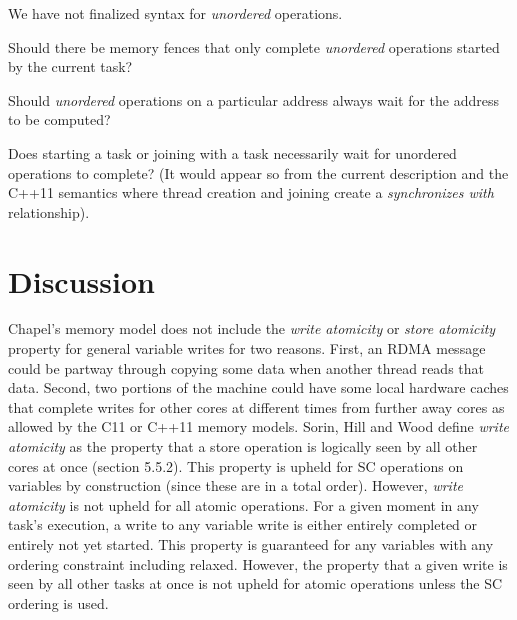 \begin{openissue}
  We have not finalized syntax for \textit{unordered} operations.
\end{openissue}
\begin{openissue}
  Should there be memory fences that only complete \textit{unordered} operations started by the current task?
\end{openissue}
\begin{openissue}
  Should \textit{unordered} operations on a particular address always wait for the address to be computed?
\end{openissue}
\begin{openissue}
  Does starting a task or joining with a task necessarily wait for unordered
  operations to complete? (It would appear so from the current description
  and the C++11 semantics where thread creation and joining create a
  \textit{synchronizes with} relationship).
\end{openissue}

\section{Discussion}

Chapel's memory model does not include the \textit{write atomicity} or
\textit{store atomicity} property for general variable writes for two reasons.
First, an RDMA message could be partway through copying some data when another
thread reads that data. Second, two portions of the machine could have some
local hardware caches that complete writes for other cores at different times
from further away cores as allowed by the C11 or C++11 memory models. Sorin,
Hill and Wood define \textit{write atomicity} as the property that a store
operation is logically seen by all other cores at once (section 5.5.2). This
property is upheld for SC operations on  variables by
construction (since these are in a total order). However, \textit{write
atomicity} is not upheld for all atomic operations. For a given moment in any
task's execution, a write to any  variable write is either
entirely completed or entirely not yet started. This property is guaranteed for
any  variables with any ordering constraint including relaxed.
However, the property that a given write is seen by all other tasks at once is
not upheld for atomic operations unless the SC ordering is used.

